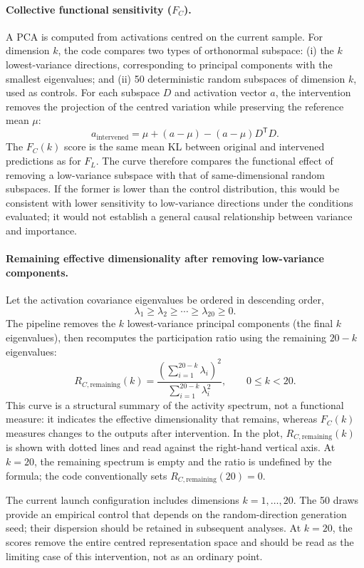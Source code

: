 \documentclass[11pt,a4paper]{article}
\begin{document}
\paragraph{Collective functional sensitivity ($F_C$).}
A PCA is computed from activations centred on the current sample. For dimension $k$, the code compares two types of orthonormal subspace: (i) the $k$ lowest-variance directions, corresponding to principal components with the smallest eigenvalues; and (ii) 50 deterministic random subspaces of dimension $k$, used as controls. For each subspace $D$ and activation vector $a$, the intervention removes the projection of the centred variation while preserving the reference mean $\mu$:
\[
 a_{\mathrm{intervened}}
 =\mu+(a-\mu)-(a-\mu)D^{\mathsf T}D.
\]
The $F_C(k)$ score is the same mean KL between original and intervened predictions as for $F_L$. The curve therefore compares the functional effect of removing a low-variance subspace with that of same-dimensional random subspaces. If the former is lower than the control distribution, this would be consistent with lower sensitivity to low-variance directions under the conditions evaluated; it would not establish a general causal relationship between variance and importance.

\paragraph{Remaining effective dimensionality after removing low-variance components.}
Let the activation covariance eigenvalues be ordered in descending order,
\[
  \lambda_1 \geq \lambda_2 \geq \cdots \geq \lambda_{20} \geq 0.
\]
The pipeline removes the $k$ lowest-variance principal components (the final $k$ eigenvalues), then recomputes the participation ratio using the remaining $20-k$ eigenvalues:
\[
  R_{C,\mathrm{remaining}}(k)
  =
  \frac{\left(\displaystyle\sum_{i=1}^{20-k}\lambda_i\right)^2}
       {\displaystyle\sum_{i=1}^{20-k}\lambda_i^2},
  \qquad 0 \leq k < 20.
\]
This curve is a structural summary of the activity spectrum, not a functional measure: it indicates the effective dimensionality that remains, whereas $F_C(k)$ measures changes to the outputs after intervention. In the plot, $R_{C,\mathrm{remaining}}(k)$ is shown with dotted lines and read against the right-hand vertical axis. At $k=20$, the remaining spectrum is empty and the ratio is undefined by the formula; the code conventionally sets $R_{C,\mathrm{remaining}}(20)=0$.

The current launch configuration includes dimensions $k=1,\ldots,20$. The 50 draws provide an empirical control that depends on the random-direction generation seed; their dispersion should be retained in subsequent analyses. At $k=20$, the scores remove the entire centred representation space and should be read as the limiting case of this intervention, not as an ordinary point.
\end{document}
